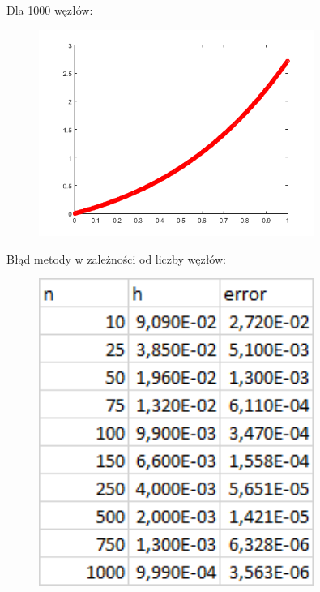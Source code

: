 \begin{samepage}
	Dla 1000 węzłów:
	
	\begin{figure}[!ht]
		\begin{center}
			\includegraphics[width=0.8\textwidth]{Lab4/charts/zad4/3/1000.png}
		\end{center}
	\end{figure}
	\FloatBarrier
\end{samepage}    

\newpage

\begin{samepage}
	Błąd metody w zależności od liczby węzłów:
	\begin{figure}[!ht]
		\begin{center}
			\includegraphics[width=0.8\textwidth]{Lab4/charts/zad4/3/error_dane.png}
		\end{center}
	\end{figure}
	\FloatBarrier
\end{samepage} 

